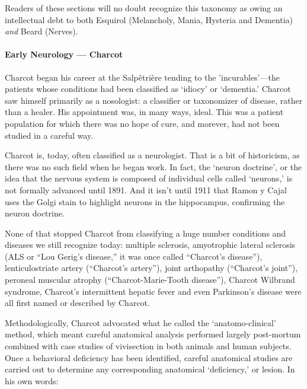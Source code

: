 Readers of these sections will no doubt recognize this taxonomy as owing an intellectual debt to both Esquirol (Melancholy, Mania, Hysteria and Dementia) \emph{and} Beard (Nerves).

\paragraph{Early Neurology --- Charcot}
\label{earlyneurology---charcot}

Charcot began his career at the Salpêtrière tending to the 'incurables'—the patients whose conditions had been classified as `idiocy' or `dementia.' Charcot saw himself primarily as a nosologist: a classifier or taxonomizer of disease, rather than a healer. His appointment was, in many ways, ideal. This was a patient population for which there was no hope of cure, and morever, had not been studied in a careful way. 

Charcot is, today, often classified as a neurologist. That is a bit of historicism, as there was no such field when he began work. In fact, the `neuron doctrine', or the idea that the nervous system is composed of individual cells called `neurons,' is not formally advanced until 1891. And it isn't until 1911 that Ramon y Cajal uses the Golgi stain to highlight neurons in the hippocampus, confirming the neuron doctrine.

None of that stopped Charcot from classifying a huge number conditions and diseases we still recognize today: multiple sclerosis, amyotrophic lateral sclerosis (ALS or “Lou Gerig's disease,” it was once called “Charcot's disease”), lenticulostriate artery (“Charcot's artery”), joint arthopathy (“Charcot's joint”), peroneal muscular atrophy (“Charcot-Marie-Tooth disease”), Charcot Wilbrand syndrome, Charcot's intermittent hepatic fever and even Parkinson's disease were all first named or described by Charcot.

Methodologically, Charcot advocated what he called the `anatomo-clinical' method, which meant careful anatomical analysis performed largely post-mortum combined with case studies of vivisection in both animals and human subjects. Once a behavioral deficiency has been identified, careful anatomical studies are carried out to determine any corresponding anatomical `deficiency,' or lesion. In his own words:

